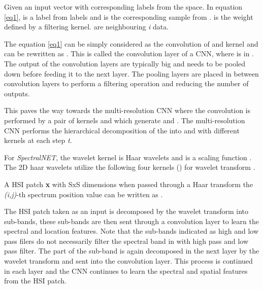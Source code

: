 \documentclass[journal]{IEEEtran}
\begin{document}
Given an input vector  with corresponding labels  from the  space. In equation \ref{eq1},  is a label from  labels and  is the corresponding sample from .  is the weight defined by a filtering kernel.  are neighbouring \textit{i} data.   



The equation \ref{eq1} can be simply considered as the convolution of  and kernel  and can be rewritten as . This is called the convolution layer of a CNN, where  is in . The output of the convolution layers are typically big and needs to be pooled down before feeding it to the next layer. The pooling layers are placed in between convolution layers to perform a filtering operation and reducing the number of outputs. 





This paves the way towards the multi-resolution CNN where the convolution is performed by a pair of kernels  and  which generate  and . The multi-resolution CNN performs the hierarchical decomposition of the  into  and  with different kernels at each step \textit{t}. 

For \textit{SpectralNET}, the wavelet kernel  is Haar wavelets and  is a scaling function  \cite{wang2006moving}. The 2D haar wavelets utilize the following four kernels () for wavelet transform \cite{liu2018multi}. 


A HSI patch \textbf{x} with SxS dimensions when passed through a Haar transform the \textit{(i,j)}-th spectrum position value can be written as .
 

The HSI patch taken as an input is decomposed by the wavelet transform into sub-bands, these sub-bands are then sent through a convolution layer to learn the spectral and location features. Note that the sub-bands indicated as high and low pass filers do not necessarily filter the spectral band in with high pass and low pass filter. The part of the sub-band is again decomposed in the next layer by the wavelet transform and sent into the convolution layer. This process is continued in each layer and the CNN continues to learn the spectral and spatial features from the HSI patch.
\end{document}

